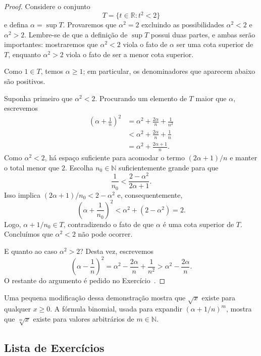 \begin{proof}
Considere o conjunto
\[
T=\{t\in\mathbb{R}:t^2<2\}
\]
e defina $\alpha=\sup T$. Provaremos que $\alpha^2=2$ excluindo as possibilidades $\alpha^2<2$ e $\alpha^2>2$. Lembre-se de que a definição de $\sup T$ possui duas partes, e ambas serão importantes: mostraremos que $\alpha^2<2$ viola o fato de $\alpha$ ser uma cota superior de $T$, enquanto $\alpha^2>2$ viola o fato de ser a menor cota superior.

Como $1\in T$, temos $\alpha\geq1$; em particular, os denominadores que aparecem abaixo são positivos.

Suponha primeiro que $\alpha^2<2$. Procurando um elemento de $T$ maior que $\alpha$, escrevemos
\[
\begin{aligned}
\left(\alpha+\frac{1}{n}\right)^2
 &=\alpha^2+\frac{2\alpha}{n}+\frac{1}{n^2}\\
 &<\alpha^2+\frac{2\alpha}{n}+\frac{1}{n}\\
 &=\alpha^2+\frac{2\alpha+1}{n}.
\end{aligned}
\]
Como $\alpha^2<2$, há espaço suficiente para acomodar o termo $(2\alpha+1)/n$ e manter o total menor que $2$. Escolha $n_0\in\mathbb{N}$ suficientemente grande para que
\[
\frac{1}{n_0}<\frac{2-\alpha^2}{2\alpha+1}.
\]
Isso implica $(2\alpha+1)/n_0<2-\alpha^2$ e, consequentemente,
\[
\left(\alpha+\frac{1}{n_0}\right)^2<\alpha^2+(2-\alpha^2)=2.
\]
Logo, $\alpha+1/n_0\in T$, contradizendo o fato de que $\alpha$ é uma cota superior de $T$. Concluímos que $\alpha^2<2$ não pode ocorrer.

E quanto ao caso $\alpha^2>2$? Desta vez, escrevemos
\[
\left(\alpha-\frac{1}{n}\right)^2
=\alpha^2-\frac{2\alpha}{n}+\frac{1}{n^2}
>\alpha^2-\frac{2\alpha}{n}.
\]
O restante do argumento é pedido no Exercício~.
\end{proof}

Uma pequena modificação dessa demonstração mostra que $\sqrt{x}$ existe para qualquer $x\geq0$. A fórmula binomial, usada para expandir $(\alpha+1/n)^m$, mostra que $\sqrt[m]{x}$ existe para valores arbitrários de $m\in\mathbb{N}$.

\subsection{Lista de Exercícios}\label{subsec:exercicios-consequencias-completude}

